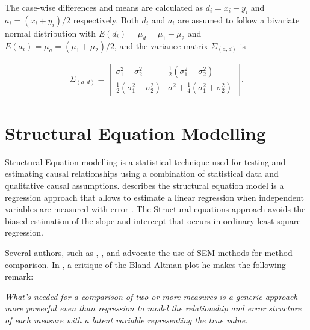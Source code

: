 \documentclass[12pt, a4paper]{report}
\theoremstyle{plain}
\theoremstyle{definition}
\theoremstyle{remark}
\begin{document}

The case-wise differences and means are calculated as $d_{i} =
x_{i}-y_{i}$ and $a_{i} = (x_{i}+y_{i})/2$  respectively. Both
$d_{i}$ and $a_{i}$ are assumed to follow a bivariate normal
distribution with $E(d_{i})= \mu_{d} = \mu_{1} - \mu_{2}$ and
$E(a_{i})= \mu_{a} = (\mu_{1} + \mu_{2})/2$, and the variance matrix
$\Sigma_{(a,d)}$ is

\begin{eqnarray}
\Sigma_{(a,d)}= \left[\begin{matrix}
\sigma^{2}_{1}+\sigma^{2}_{2}&\frac{1}{2}(\sigma^{2}_{1}-\sigma^{2}_{2})\\
\frac{1}{2}(\sigma^{2}_{1}-\sigma^{2}_{2})&\sigma^{2}+
\frac{1}{4}(\sigma^{2}_{1}+\sigma^{2}_{2})
\end{matrix} \right].
\end{eqnarray}












\chapter{Structural Equation Modelling}

Structural Equation modelling is a statistical technique used for testing and estimating causal relationships using a combination of statistical data and qualitative causal assumptions.\citep{carrasco2004} describes the structural equation model is a regression approach that allows to estimate a linear 
regression when independent variables are measured with error .
The Structural equations approach avoids the biased estimation of the slope and intercept that occurs in ordinary least square regression.


 Several authors, such as \citet{Lewis}, \citet{gkelly1985},\citet{voelkel2005} and \citet{hopkins2004bias} advocate the use of SEM methods for method comparison. In \citet{hopkins2004bias}, a critique of the Bland-Altman plot he makes the following remark:

\emph{What's needed for a comparison of two or more measures is a
	generic approach more powerful even than regression to model the
	relationship and error structure of each measure with a latent
	variable representing the true value.}
\end{document}

